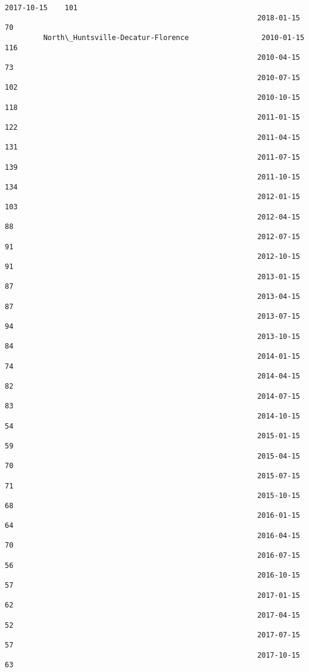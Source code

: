 \documentclass[11pt]{article}
\begin{document}
\begin{Verbatim}[commandchars=\\\{\}]
                                                           2017-10-15    101
                                                           2018-01-15     70
         North\_Huntsville-Decatur-Florence                 2010-01-15    116
                                                           2010-04-15     73
                                                           2010-07-15    102
                                                           2010-10-15    118
                                                           2011-01-15    122
                                                           2011-04-15    131
                                                           2011-07-15    139
                                                           2011-10-15    134
                                                           2012-01-15    103
                                                           2012-04-15     88
                                                           2012-07-15     91
                                                           2012-10-15     91
                                                           2013-01-15     87
                                                           2013-04-15     87
                                                           2013-07-15     94
                                                           2013-10-15     84
                                                           2014-01-15     74
                                                           2014-04-15     82
                                                           2014-07-15     83
                                                           2014-10-15     54
                                                           2015-01-15     59
                                                           2015-04-15     70
                                                           2015-07-15     71
                                                           2015-10-15     68
                                                           2016-01-15     64
                                                           2016-04-15     70
                                                           2016-07-15     56
                                                           2016-10-15     57
                                                           2017-01-15     62
                                                           2017-04-15     52
                                                           2017-07-15     57
                                                           2017-10-15     63

\end{Verbatim}
\end{document}
